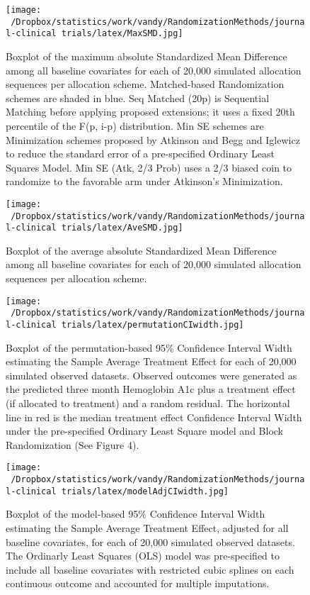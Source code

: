 \documentclass[12pt,oneside]{book}
\newlength{\li}\setlength{\li}{14.48pt}
\newlength{\di}\setlength{\di}{-3.5mm}
\theoremstyle{definition}
\theoremstyle{definition}
\theoremstyle{definition}
\theoremstyle{remark}
\begin{document}
\begin{figure}
\centering
\texttt{[image: ~/Dropbox/statistics/work/vandy/RandomizationMethods/journal-clinical trials/latex/MaxSMD.jpg]}
\caption{\label{fig:MaxSMD}Boxplot of the maximum absolute Standardized Mean
Difference among all baseline covariates for each of 20,000 simulated
allocation sequences per allocation scheme. Matched-based Randomization
schemes are shaded in blue. Seq Matched (20p) is Sequential Matching
before applying proposed extensions; it uses a fixed 20th percentile of
the F(p, i-p) distribution. Min SE schemes are Minimization schemes
proposed by Atkinson and Begg and Iglewicz to reduce the standard error
of a pre-specified Ordinary Least Squares Model. Min SE (Atk, 2/3 Prob)
uses a 2/3 biased coin to randomize to the favorable arm under
Atkinson's Minimization.}
\end{figure}

\begin{figure}
\centering
\texttt{[image: ~/Dropbox/statistics/work/vandy/RandomizationMethods/journal-clinical trials/latex/AveSMD.jpg]}
\caption{\label{fig:AveSMD}Boxplot of the average absolute Standardized Mean
Difference among all baseline covariates for each of 20,000 simulated
allocation sequences per allocation scheme.}
\end{figure}

\begin{figure}
\centering
\texttt{[image: ~/Dropbox/statistics/work/vandy/RandomizationMethods/journal-clinical trials/latex/permutationCIwidth.jpg]}
\caption{\label{fig:permCIwidth}Boxplot of the permutation-based 95\%
Confidence Interval Width estimating the Sample Average Treatment Effect
for each of 20,000 simulated observed datasets. Observed outcomes were
generated as the predicted three month Hemoglobin A1c plus a treatment
effect (if allocated to treatment) and a random residual. The horizontal
line in red is the median treatment effect Confidence Interval Width
under the pre-specified Ordinary Least Square model and Block
Randomization (See Figure 4).}
\end{figure}

\begin{figure}
\centering
\texttt{[image: ~/Dropbox/statistics/work/vandy/RandomizationMethods/journal-clinical trials/latex/modelAdjCIwidth.jpg]}
\caption{\label{fig:adjCIwidth}Boxplot of the model-based 95\% Confidence
Interval Width estimating the Sample Average Treatment Effect, adjusted
for all baseline covariates, for each of 20,000 simulated observed
datasets. The Ordinarly Least Squares (OLS) model was pre-specified to
include all baseline covariates with restricted cubic splines on each
continuous outcome and accounted for multiple imputations.}
\end{figure}
\end{document}
